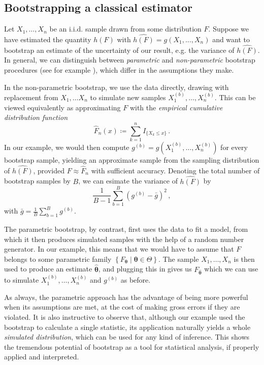 \documentclass[a4paper]{book}
\theoremstyle{plain}
\begin{document}
\subsection{Bootstrapping a classical estimator}

Let $X_1, \dots, X_n$ be an i.i.d. sample drawn from some distribution $F$. Suppose we have estimated the quantity $h(F)$ with $\widehat{h(F)} = g(X_1, \dots, X_n)$ and want to bootstrap an estimate of the uncertainty of our result, e.g. the variance of $\widehat{h(F)}$. In general, we can distinguish  between \emph{parametric} and \emph{non-parametric} bootstrap procedures (see for example \cite[Chapter 2]{davison}), which differ in the assumptions they make.

In the non-parametric bootstrap, we use the data directly, drawing with replacement from $X_1, \dots X_n$ to simulate new samples $X^{(b)}_1, \dots, X^{(b)}_n$. This can be viewed equivalently as approximating $F$ with the \emph{empirical cumulative distribution function}
\begin{equation}
    \hat{F}_n(x) \coloneqq \sum_{k=1}^n I_{\{ X_k \leq x \}} \,.
\end{equation}
In our example, we would then compute $g^{(b)} = g(X^{(b)}_1, \dots, X^{(b)}_n)$ for every bootstrap sample, yielding an approximate sample from the sampling distribution of $\widehat{h(F)}$, provided $F \approx \hat{F}_n$ with sufficient accuracy. Denoting the total number of bootstrap samples by $B$, we can esimate the variance of $\widehat{h(F)}$ by
\begin{equation}
    \frac{1}{B-1}\sum_{b=1}^B(g^{(b)} - \bar{g})^2 \,,
\end{equation}
with $\bar{g} = \frac{1}{B} \sum_{b=1}^B g^{(b)}$.

The parametric bootstrap, by contrast, first uses the data to fit a model, from which it then produces simulated samples with the help of a random number generator. In our example, this means that we would have to assume that $F$ belongs to some parametric family $\left \{ F_{\bm{\theta}} \mid  \bm{\theta} \in \Theta \right \}$. The sample $X_1, \dots, X_n$ is then used to produce an estimate $\bm{\hat{\theta}}$, and plugging this in gives us $F_{\bm{\hat{\theta}}}$ which we can use to simulate $X^{(b)}_1, \dots , X^{(b)}_n$ and $g^{(b)}$ as before. 

As always, the parametric approach has the advantage of being more powerful when its assumptions are met, at the cost of making gross errors if they are violated. It is also instructive to observe that, although our example used the bootstrap to calculate a single statistic, its application naturally yields a whole \emph{simulated distribution}, which can be used for any kind of inference. This shows the tremendous potential of bootstrap as a tool for statistical analysis, if properly applied and interpreted.
\end{document}
